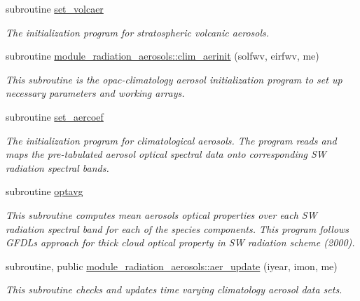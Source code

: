 \begin{DoxyCompactItemize}
\mbox{\label{group__module__radiation__aerosols_ga9b4558586df512eab092565549b835e2}} 
subroutine \hyperlink{group__module__radiation__aerosols_ga9b4558586df512eab092565549b835e2}{set\+\_\+volcaer}
\begin{DoxyCompactList}\small\item\em The initialization program for stratospheric volcanic aerosols. \end{DoxyCompactList}\item 
subroutine \hyperlink{group__module__radiation__aerosols_gacdc24d7d4c01b97920ef940cc01c9cc0}{module\+\_\+radiation\+\_\+aerosols\+::clim\+\_\+aerinit} (solfwv, eirfwv, me)
\begin{DoxyCompactList}\small\item\em This subroutine is the opac-\/climatology aerosol initialization program to set up necessary parameters and working arrays. \end{DoxyCompactList}\item 
subroutine \hyperlink{group__module__radiation__aerosols_ga95fabbc4272ae70f3b345f9b1a898d46}{set\+\_\+aercoef}
\begin{DoxyCompactList}\small\item\em The initialization program for climatological aerosols. The program reads and maps the pre-\/tabulated aerosol optical spectral data onto corresponding SW radiation spectral bands. \end{DoxyCompactList}\item 
\mbox{\label{group__module__radiation__aerosols_ga637761b6110739f2d96322e2ddcc1291}} 
subroutine \hyperlink{group__module__radiation__aerosols_ga637761b6110739f2d96322e2ddcc1291}{optavg}
\begin{DoxyCompactList}\small\item\em This subroutine computes mean aerosols optical properties over each SW radiation spectral band for each of the species components. This program follows G\+F\+DL\textquotesingle{}s approach for thick cloud optical property in SW radiation scheme (2000). \end{DoxyCompactList}\item 
subroutine, public \hyperlink{group__module__radiation__aerosols_ga237071d2a0691d5aae199937d9b6aca5}{module\+\_\+radiation\+\_\+aerosols\+::aer\+\_\+update} (iyear, imon, me)
\begin{DoxyCompactList}\small\item\em This subroutine checks and updates time varying climatology aerosol data sets. \end{DoxyCompactList}\item 

\end{DoxyCompactItemize}
